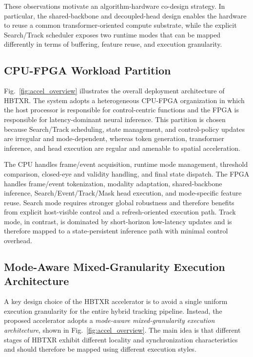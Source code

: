 ﻿\documentclass[journal]{IEEEtran}
\begin{document}
These observations motivate an algorithm-hardware co-design strategy. In particular, the shared-backbone and decoupled-head design enables the hardware to reuse a common transformer-oriented compute substrate, while the explicit Search/Track scheduler exposes two runtime modes that can be mapped differently in terms of buffering, feature reuse, and execution granularity.

\subsection{CPU-FPGA Workload Partition}

Fig.~\ref{fig:accel_overview} illustrates the overall deployment architecture of HBTXR. The system adopts a heterogeneous CPU-FPGA organization in which the host processor is responsible for control-centric functions and the FPGA is responsible for latency-dominant neural inference. This partition is chosen because Search/Track scheduling, state management, and control-policy updates are irregular and mode-dependent, whereas token generation, transformer inference, and head execution are regular and amenable to spatial acceleration.

The CPU handles frame/event acquisition, runtime mode management, threshold comparison, closed-eye and validity handling, and final state dispatch. The FPGA handles frame/event tokenization, modality adaptation, shared-backbone inference, Search/Event/Track/Mask head execution, and mode-specific feature reuse. Search mode requires stronger global robustness and therefore benefits from explicit host-visible control and a refresh-oriented execution path. Track mode, in contrast, is dominated by short-horizon low-latency updates and is therefore mapped to a state-persistent inference path with minimal control overhead.

\subsection{Mode-Aware Mixed-Granularity Execution Architecture}

A key design choice of the HBTXR accelerator is to avoid a single uniform execution granularity for the entire hybrid tracking pipeline. Instead, the proposed accelerator adopts a \emph{mode-aware mixed-granularity execution architecture}, shown in Fig.~\ref{fig:accel_overview}. The main idea is that different stages of HBTXR exhibit different locality and synchronization characteristics and should therefore be mapped using different execution styles.
\end{document}
